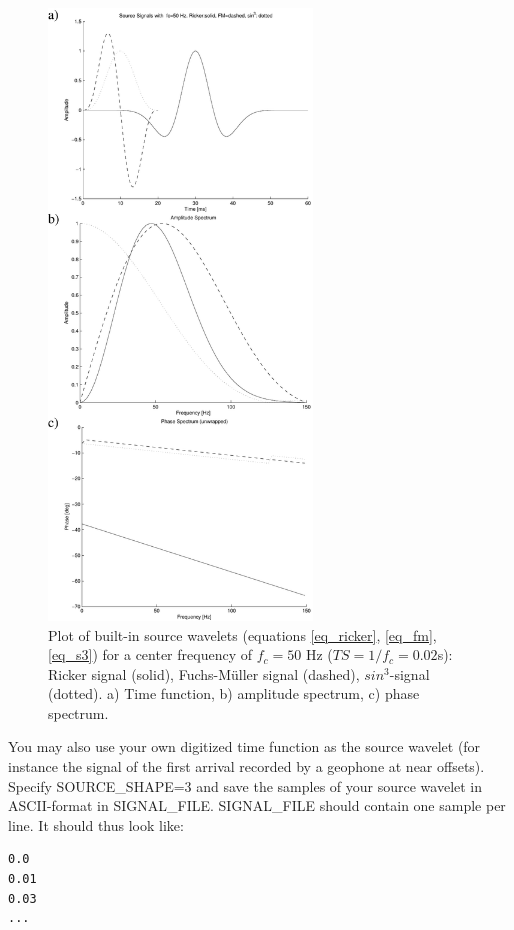 \documentclass{hitec}
\begin{document}
\begin{figure}
\begin{center}
\includegraphics[width=7cm,angle=0]{eps/signals.pdf}
\end{center}
\caption{Plot of built-in source wavelets (equations \ref{eq_ricker}, \ref{eq_fm}, \ref{eq_s3}) for a center frequency of $f_c=50$ Hz 
($TS=1/f_c=0.02$s): Ricker signal (solid), Fuchs-M\"uller signal (dashed), $sin^3$-signal (dotted). a) Time function, b) amplitude
spectrum, c) phase spectrum.  }
\label{fig_source_wavelets}
\end{figure}

You may also use your own digitized time function as the source wavelet (for instance the signal of the first arrival recorded by a geophone at near offsets). Specify SOURCE\_SHAPE=3 and save the samples of
your source wavelet in ASCII-format in SIGNAL\_FILE. SIGNAL\_FILE should contain one sample per line. It should thus look like:

\begin{verbatim}
0.0
0.01
0.03
...
\end{verbatim}
\end{document}

